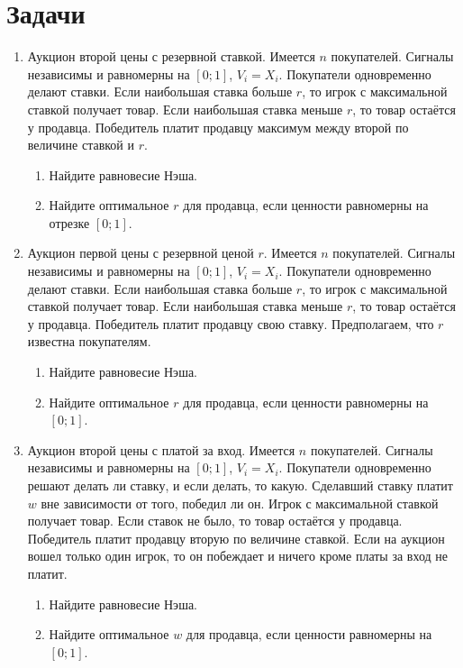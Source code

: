 \section{Задачи}
\begin{enumerate}
\item Аукцион второй цены с резервной ставкой. Имеется $n$ покупателей.  Сигналы независимы и равномерны на $ [0;1] $, $ V_{i}=X_{i} $. Покупатели одновременно делают ставки. Если наибольшая ставка больше $ r $, то игрок с максимальной ставкой получает товар. Если наибольшая ставка меньше $ r $, то товар остаётся у продавца. Победитель платит продавцу максимум между второй по величине ставкой и $r$.
\begin{enumerate}
\item Найдите равновесие Нэша.
\item Найдите оптимальное $ r $ для продавца, если ценности равномерны на отрезке $ [0;1] $.
\end{enumerate}


\item Аукцион первой цены с резервной ценой $ r $. Имеется $ n $ покупателей.  Сигналы независимы и равномерны на $ [0;1] $, $ V_{i}=X_{i} $. Покупатели одновременно делают ставки. Если наибольшая ставка больше $ r $, то игрок с максимальной ставкой получает товар. Если наибольшая ставка меньше $ r $, то товар остаётся у продавца. Победитель платит продавцу свою ставку. Предполагаем, что $ r $ известна покупателям.
\begin{enumerate}
\item Найдите равновесие Нэша.
\item Найдите оптимальное $ r $ для продавца, если ценности равномерны на $ [0;1] $.
\end{enumerate}


\item Аукцион второй цены с платой за вход. Имеется $ n $ покупателей.  Сигналы независимы и равномерны на $ [0;1] $, $ V_{i}=X_{i} $. Покупатели одновременно решают делать ли ставку, и если делать, то какую. Сделавший ставку платит $ w $ вне зависимости от того, победил ли он. Игрок с максимальной ставкой получает товар. Если ставок не было, то товар остаётся у продавца. Победитель платит продавцу вторую по величине ставкой. Если на аукцион вошел только один игрок, то он побеждает и  ничего кроме платы за вход не платит.
\begin{enumerate}
\item Найдите равновесие Нэша.
\item Найдите оптимальное $ w $ для продавца, если ценности равномерны на $ [0;1] $.
\end{enumerate}



\end{enumerate}
